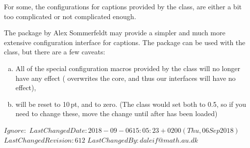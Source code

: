 For some, the configurations for captions provided by the class, are
either a bit too complicated or not complicated enough.

The  package by Alex Sommerfeldt may provide a simpler
and much more extensive configuration interface for captions. The
package can be used with the class, but there are a few caveats:
\begin{enumerate}[(a)]
\item All of the special configuration macros provided by the class
  will no longer have any effect ( overwrites the core,
  and thus our interfaces will have no effect),
\item \cmd{\abovecaptionskip} will be reset to 10\,pt, and
  \cmd{\belowcaptionskip} to zero. (The class would set both to
  0.5\cmd{\onelineskip}, so if you need to change these, move the
  change until after  has been loaded) 
\end{enumerate}











\svnidlong
{$Ignore: $}
{$LastChangedDate: 2018-09-06 15:05:23 +0200 (Thu, 06 Sep 2018) $}
{$LastChangedRevision: 612 $}
{$LastChangedBy: daleif@math.au.dk $}




